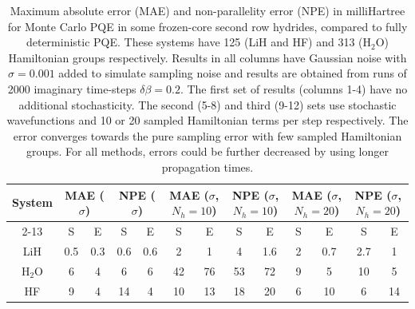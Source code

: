 \documentclass[%
 reprint,
 amsmath,amssymb,
 aps,
]{revtex4-2}
\begin{document}
\begin{table}
    \centering
    \begin{tabular}{c||c|c|c|c||c|c|c|c||c|c|c|c}
      \multirow{2}{*}{System} &  \multicolumn{2}{c|}{MAE ($\sigma$)} & \multicolumn{2}{c||}{NPE ($\sigma$)} & \multicolumn{2}{c|}{MAE ($\sigma$, $N_h = 10$)} & \multicolumn{2}{c||}{NPE ($\sigma$, $N_h = 10$)} & \multicolumn{2}{c|}{MAE ($\sigma$, $N_h = 20$)} &\multicolumn{2}{c}{NPE ($\sigma$, $N_h = 20$)}\\
      \cline{2-13}
      & S & E& S & E& S & E& S & E& S & E& S & E\\
      \hline
        LiH & 0.5 & 0.3 & 0.6 & 0.6 & \hspace*{5mm}2\hspace*{5mm} & 1& \hspace*{5mm}4\hspace*{5mm} &1.6&\hspace*{5mm}2\hspace*{5mm} &0.7 &\hspace*{4mm}2.7\hspace*{4mm}&1\\
         H$_2$O & 6 & 4 & 6& 6& 42 &76 & 53& 72&9&5& 10& 5 \\
         HF& 9 & 4& 14 & 4 & 10& 13& 18 & 20 & 6 & 10 & 6 &14\\
         \hline
    \end{tabular}
    \caption{\small \justifying Maximum absolute error (MAE) and non-parallelity error (NPE) in milliHartree for Monte Carlo PQE in some frozen-core second row hydrides, compared to fully deterministic PQE. These systems have 125 (LiH and HF) and 313 (H$_2$O) Hamiltonian groups respectively. Results in all columns have Gaussian noise with $\sigma = 0.001$ added to simulate sampling noise and results are obtained from runs of 2000 imaginary time-steps $\delta \beta = 0.2$. The first set of results (columns 1-4) have no additional stochasticity. The second (5-8) and third (9-12) sets use stochastic wavefunctions and 10 or 20 sampled Hamiltonian terms per step respectively. The error converges towards the pure sampling error with few sampled Hamiltonian groups. For all methods, errors could be further decreased by using longer propagation times.}
    \label{tab:hydrides}
\end{table}
\end{document}
